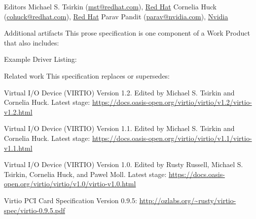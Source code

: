 \begin{titlepage}
\begin{oasistitlesection}{Editors}
Michael S. Tsirkin (\href{mailto:mst@redhat.com}{mst@redhat.com}), \href{https://www.redhat.com/}{Red Hat}\newline
Cornelia Huck (\href{mailto:cohuck@redhat.com}{cohuck@redhat.com}), \href{https://www.redhat.com/}{Red Hat}\newline
Parav Pandit (\href{mailto:parav@nvidia.com}{parav@nvidia.com}), \href{https://www.nvidia.com/}{Nvidia}\newline
\end{oasistitlesection}


\begin{oasistitlesection}{Additional artifacts}
This prose specification is one component of a Work Product that also includes:
\begin{itemize*}
	\item Example Driver Listing: \newline
	\virtiourllistings
\end{itemize*}
\end{oasistitlesection}
\vspace{-0.2in}

\begin{oasistitlesection}{Related work}
This specification replaces or supersedes:
\begin{itemize*}
	\item Virtual I/O Device (VIRTIO) Version 1.2. Edited by Michael S. Tsirkin and Cornelia Huck. Latest stage:\newline
	\url{https://docs.oasis-open.org/virtio/virtio/v1.2/virtio-v1.2.html}
	\item Virtual I/O Device (VIRTIO) Version 1.1. Edited by Michael S. Tsirkin and Cornelia Huck. Latest stage:\newline
	\url{https://docs.oasis-open.org/virtio/virtio/v1.1/virtio-v1.1.html}
	\item Virtual I/O Device (VIRTIO) Version 1.0. Edited by Rusty Russell, Michael S. Tsirkin, Cornelia Huck, and Pawel
 Moll. Latest stage:\newline
	\url{https://docs.oasis-open.org/virtio/virtio/v1.0/virtio-v1.0.html}
	\item Virtio PCI Card Specification Version 0.9.5:\newline
	\url{http://ozlabs.org/~rusty/virtio-spec/virtio-0.9.5.pdf}
\end{itemize*}
\end{oasistitlesection}
\vspace{-0.2in}


\end{titlepage}
